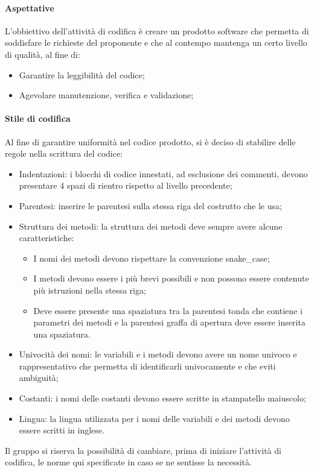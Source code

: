 \documentclass[../norme_di_progetto.tex]{subfiles}
\begin{document}
    \paragraph{Aspettative}
    L'obbiettivo dell'attività di codifica è creare un prodotto software che permetta di soddisfare le richieste del proponente e che al contempo mantenga un certo livello di qualità, al fine di:
    \begin{itemize}
        \item Garantire la leggibilità del codice;
        \item Agevolare manutenzione, verifica e validazione;
    \end{itemize}

    \paragraph{Stile di codifica}
    Al fine di garantire uniformità nel codice prodotto, si è deciso di stabilire delle regole nella scrittura del codice:
    \begin{itemize}
        \item Indentazioni: i blocchi di codice innestati, ad esclusione dei commenti, devono presentare 4 spazi di rientro rispetto al livello precedente;
        \item Parentesi: inserire le parentesi sulla stessa riga del costrutto che le usa;
        \item Struttura dei metodi: la struttura dei metodi deve sempre avere alcune caratteristiche:
        \begin{itemize}
            \item I nomi dei metodi devono rispettare la convenzione snake\_case;
            \item I metodi devono essere i più brevi possibili e non possono essere contenute più istruzioni nella stessa riga;
            \item Deve essere presente una spaziatura tra la parentesi tonda che contiene i parametri dei metodi e la parentesi graffa di apertura deve essere inserita una spaziatura.
        \end{itemize}
        \item Univocità dei nomi: le variabili e i metodi devono avere un nome univoco e rappresentativo che permetta di identificarli univocamente e che eviti ambiguità;
        \item Costanti: i nomi delle costanti devono essere scritte in stampatello maiuscolo;
        \item Lingua: la lingua utilizzata per i nomi delle variabili e dei metodi devono essere scritti in inglese.
    \end{itemize}
    Il gruppo si riserva la possibilità di cambiare, prima di iniziare l'attività di codifica, le norme qui specificate in caso se ne sentisse la necessità.
\end{document}

